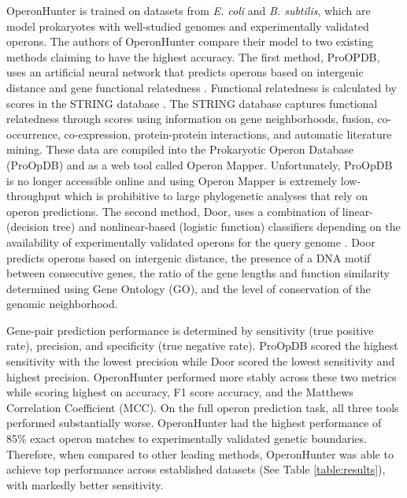 \documentclass{article}
\begin{document}
OperonHunter is trained on datasets from \textit{E. coli} and \textit{B. subtilis}, which are model prokaryotes with well-studied genomes and experimentally validated operons. The authors of OperonHunter compare their model to two existing methods claiming to have the highest accuracy. The first method, ProOPDB, uses an artificial neural network that predicts operons based on intergenic distance and gene functional relatedness \cite{taboada_high_2010}. Functional relatedness is calculated by scores in the STRING database \citet{jensen_string_2009}. The STRING database captures functional relatedness through scores using information on gene neighborhoods, fusion, co-occurrence, co-expression, protein-protein interactions, and automatic literature mining. These data are compiled into the Prokaryotic Operon Database (ProOpDB) and as a web tool called Operon Mapper. Unfortunately, ProOpDB is no longer accessible online and using Operon Mapper is extremely low-throughput which is prohibitive to large phylogenetic analyses that rely on operon predictions. The second method, Door, uses a combination of linear- (decision tree) and nonlinear-based (logistic function) classifiers depending on the availability of experimentally validated operons for the query genome \cite{mao_2014}. Door predicts operons based on intergenic distance, the presence of a DNA motif between consecutive genes, the ratio of the gene lengths and function similarity determined using Gene Ontology (GO), and the level of conservation of the genomic neighborhood.

Gene-pair prediction performance is determined by sensitivity (true positive rate), precision, and specificity (true negative rate). ProOpDB scored the highest sensitivity with the lowest precision while Door scored the lowest sensitivity and highest precision. OperonHunter performed more stably across these two metrics while scoring highest on accuracy, F1 score accuracy, and the Matthews Correlation Coefficient (MCC). On the full operon prediction task, all three tools performed substantially worse. OperonHunter had the highest performance of 85\% exact operon matches to experimentally validated genetic boundaries. Therefore, when compared to other leading methods, OperonHunter was able to achieve top performance across established datasets (See Table \ref{table:results}), with markedly better sensitivity.

\end{document}
